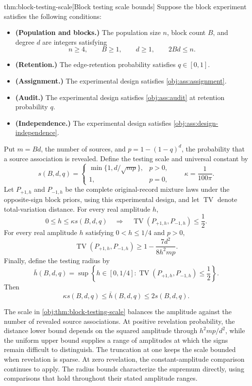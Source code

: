 \begin{theoremv}{thm:block-testing-scale}[Block testing scale bounds]
Suppose the block experiment satisfies the following conditions:
\begin{itemize}
\item \textbf{(Population and blocks.)} The population size \(n\), block count \(B\), and degree \(d\) are integers satisfying
\[
n\ge4,\qquad B\ge1,\qquad d\ge1,\qquad 2Bd\le n.
\]
\item \textbf{(Retention.)} The edge-retention probability satisfies \(q\in[0,1]\).
\item \textbf{(Assignment.)} The experimental design satisfies \cref{obj:ass:assignment}.
\item \textbf{(Audit.)} The experimental design satisfies \cref{obj:ass:audit} at retention probability \(q\).
\item \textbf{(Independence.)} The experimental design satisfies \cref{obj:ass:design-independence}.
\end{itemize}
Put \(m=Bd\), the number of sources, and \(p=1-(1-q)^d\), the probability that a source association is revealed. Define the testing scale and universal constant by
\[
s(B,d,q)=
\begin{cases}
\min\{1,d/\sqrt{mp}\},&p>0,\\
1,&p=0,
\end{cases}
\qquad
\kappa=\frac{1}{100\pi}.
\]
Let \(P_{+1,h}\) and \(P_{-1,h}\) be the complete original-record mixture laws under the opposite-sign block priors, using this experimental design, and let \(\operatorname{TV}\) denote total-variation distance. For every real amplitude \(h\),
\[
0\le h\le\kappa s(B,d,q)
\quad\Longrightarrow\quad
\operatorname{TV}(P_{+1,h},P_{-1,h})\le\frac12.
\]
For every real amplitude \(h\) satisfying \(0<h\le1/4\) and \(p>0\),
\[
\operatorname{TV}(P_{+1,h},P_{-1,h})
\ge 1-\frac{7d^2}{8h^2mp}.
\]
Finally, define the testing radius by
\[
\bar h(B,d,q)
=
\sup\left\{
h\in[0,1/4]:
\operatorname{TV}(P_{+1,h},P_{-1,h})\le\frac12
\right\}.
\]
Then
\[
\kappa s(B,d,q)\le\bar h(B,d,q)\le2s(B,d,q).
\]
\end{theoremv}

The scale in \cref{obj:thm:block-testing-scale} balances the amplitude against the number of revealed source associations. At positive revelation probability, the distance lower bound depends on the squared amplitude through \(h^2mp/d^2\), while the uniform upper bound supplies a range of amplitudes at which the signs remain difficult to distinguish. The truncation at one keeps the scale bounded when revelation is sparse. At zero revelation, the constant-amplitude comparison continues to apply. The radius bounds characterize the supremum directly, using comparisons that hold throughout their stated amplitude ranges.

